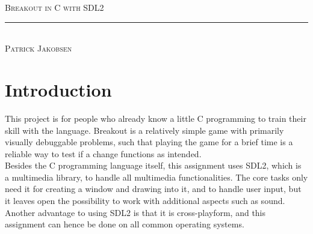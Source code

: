 \documentclass[12pt]{article}
\begin{document}
\begin{titlepage}
\center
\textsc{\huge Breakout in C with SDL2}
\rule{\linewidth}{0.5mm}
\\[1em]
\textsc{\large Patrick Jakobsen}
\end{titlepage}

\tableofcontents

\newpage
{}


\section{Introduction}
This project is for people who already know a little C programming to train their skill with the language. Breakout is a relatively simple game with primarily visually debuggable problems, such that playing the game for a brief time is a reliable way to test if a change functions as intended.\\
Besides the C programming language itself, this assignment uses SDL2, which is a multimedia library, to handle all multimedia functionalities. The core tasks only need it for creating a window and drawing into it, and to handle user input, but it leaves open the possibility to work with additional aspects such as sound. Another advantage to using SDL2 is that it is cross-playform, and this assignment can hence be done on all common operating systems.
\end{document}
